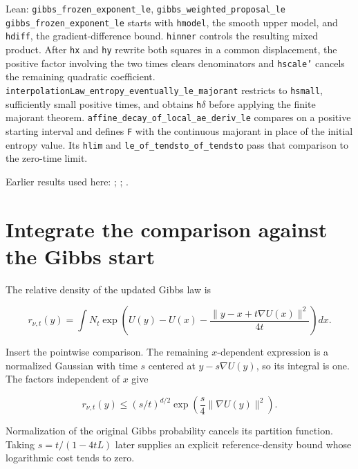 \documentclass[11pt,a4paper]{article}
\begin{document}
\begin{leanbox}{Lean: \texttt{gibbs\_\allowbreak{}frozen\_\allowbreak{}exponent\_\allowbreak{}le}, \texttt{gibbs\_\allowbreak{}weighted\_\allowbreak{}proposal\_\allowbreak{}le}}
\texttt{gibbs\_\allowbreak{}frozen\_\allowbreak{}exponent\_\allowbreak{}le} starts with \texttt{hmodel}, the smooth upper model, and \texttt{hdiff}, the gradient-difference bound. \texttt{hinner} controls the resulting mixed product. After \texttt{hx} and \texttt{hy} rewrite both squares in a common displacement, the positive factor involving the two times clears denominators and \texttt{hscale'} cancels the remaining quadratic coefficient. \texttt{interpolation\allowbreak{}Law\_\allowbreak{}entropy\_\allowbreak{}eventually\_\allowbreak{}le\_\allowbreak{}majorant} restricts to \texttt{hsmall}, sufficiently small positive times, and obtains \texttt{h\ensuremath{\delta}} before applying the finite majorant theorem. \texttt{affine\_\allowbreak{}decay\_\allowbreak{}of\_\allowbreak{}local\_\allowbreak{}ae\_\allowbreak{}deriv\_\allowbreak{}le} compares on a positive starting interval and defines \texttt{F} with the continuous majorant in place of the initial entropy value. Its \texttt{hlim} and \texttt{le\_\allowbreak{}of\_\allowbreak{}tendsto\_\allowbreak{}of\_\allowbreak{}tendsto} pass that comparison to the zero-time limit.
\end{leanbox}


Earlier results used here: \cite[Section~3.37.12]{LangevinLean2026ULASC}; \cite[Section~3.37.14]{LangevinLean2026ULASC}; \cite[Section~3.9.1]{LangevinLean2026ULASC}.

\section{\texorpdfstring{Integrate the comparison against the Gibbs start}{Integrate the comparison against the Gibbs start}}


The relative density of the updated Gibbs law is

\[r_{\nu,t}(y)=\int N_t\exp\!\left(U(y)-U(x)-\frac{\|y-x+t\nabla U(x)\|^2}{4t}\right)dx.\]

Insert the pointwise comparison. The remaining \(x\)-dependent expression is a normalized Gaussian with time \(s\) centered at \(y-s\nabla U(y)\), so its integral is one. The factors independent of \(x\) give

\[r_{\nu,t}(y)\le(s/t)^{d/2}\exp\!\left(\frac s4\|\nabla U(y)\|^2\right).\]

Normalization of the original Gibbs probability cancels its partition function. Taking \(s=t/(1-4tL)\) later supplies an explicit reference-density bound whose logarithmic cost tends to zero.
\end{document}
